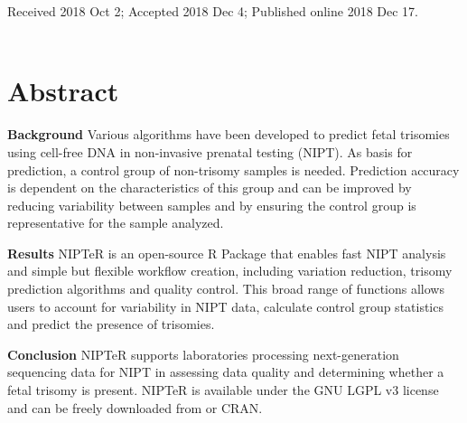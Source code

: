 \noindent
Received 2018 Oct 2; Accepted 2018 Dec 4; Published online 2018 Dec 17.
\\~\\


\section*{Abstract}\label{abstract}
\textbf{Background}
Various algorithms have been developed to predict fetal trisomies using cell-free DNA in non-invasive prenatal testing (NIPT). 
As basis for prediction, a control group of non-trisomy samples is needed. Prediction accuracy is dependent on the characteristics of this group and can be improved by reducing variability between samples and by ensuring the control group is representative for the sample analyzed.

\textbf{Results}
NIPTeR is an open-source R Package that enables fast NIPT analysis and simple but flexible workflow creation, including variation reduction, trisomy prediction algorithms and quality control. This broad range of functions allows users to account for variability in NIPT data, calculate control group statistics and predict the presence of trisomies.

\textbf{Conclusion}
NIPTeR supports laboratories processing next-generation sequencing data for NIPT in assessing data quality and determining whether a fetal trisomy is present. NIPTeR is available under the GNU LGPL v3 license and can be freely downloaded from  or CRAN.



